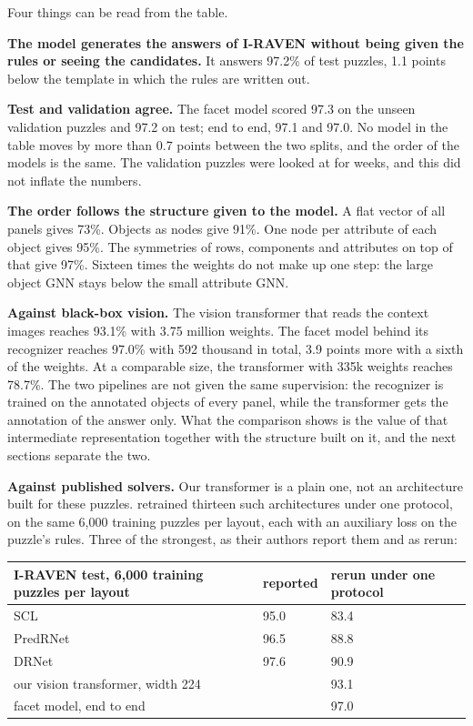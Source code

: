 Four things can be read from the table.

\textbf{The model generates the answers of I-RAVEN without being given the rules or seeing the candidates.} It answers 97.2\% of test puzzles, 1.1 points below the template in which the rules are written out.

\textbf{Test and validation agree.} The facet model scored 97.3 on the unseen validation puzzles and 97.2 on test; end to end, 97.1 and 97.0. No model in the table moves by more than 0.7 points between the two splits, and the order of the models is the same. The validation puzzles were looked at for weeks, and this did not inflate the numbers.

\textbf{The order follows the structure given to the model.} A flat vector of all panels gives 73\%. Objects as nodes give 91\%. One node per attribute of each object gives 95\%. The symmetries of rows, components and attributes on top of that give 97\%. Sixteen times the weights do not make up one step: the large object GNN stays below the small attribute GNN.

\textbf{Against black-box vision.} The vision transformer that reads the context images reaches 93.1\% with 3.75 million weights. The facet model behind its recognizer reaches 97.0\% with 592 thousand in total, 3.9 points more with a sixth of the weights. At a comparable size, the transformer with 335k weights reaches 78.7\%. The two pipelines are not given the same supervision: the recognizer is trained on the annotated objects of every panel, while the transformer gets the annotation of the answer only. What the comparison shows is the value of that intermediate representation together with the structure built on it, and the next sections separate the two.

\textbf{Against published solvers.} Our transformer is a plain one, not an architecture built for these puzzles. \citet{malkinski2025airaven} retrained thirteen such architectures under one protocol, on the same 6,000 training puzzles per layout, each with an auxiliary loss on the puzzle's rules. Three of the strongest, as their authors report them and as rerun:

\begin{center}\small
\begin{tabular}{@{}lll@{}}
\toprule
I-RAVEN test, 6,000 training puzzles per layout & reported & rerun under one protocol \\
\midrule
SCL & 95.0 & 83.4 \\
PredRNet & 96.5 & 88.8 \\
DRNet & 97.6 & 90.9 \\
our vision transformer, width 224 &  & 93.1 \\
facet model, end to end &  & 97.0 \\
\bottomrule
\end{tabular}
\end{center}

